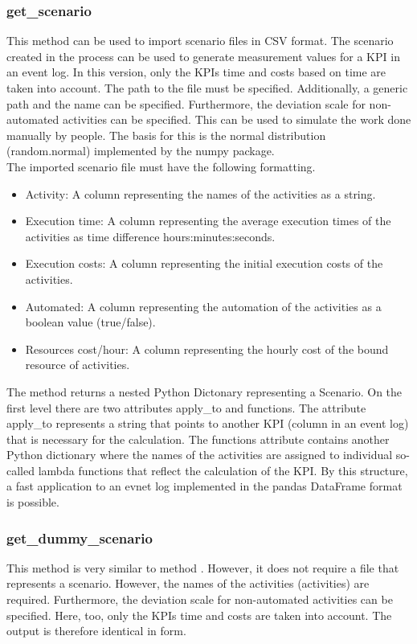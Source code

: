     \subsubsection*{get\_scenario}
    This method can be used to import scenario files in CSV format. The scenario created in the process can be used to generate measurement values for a KPI in an event log. In this version, only the KPIs time and costs based on time are taken into account. The path to the file must be specified. Additionally, a generic path and the name can be specified. Furthermore, the deviation scale for non-automated activities can be specified. This can be used to simulate the work done manually by people. The basis for this is the normal distribution (random.normal) implemented by the numpy package.\\
    The imported scenario file must have the following formatting.
    \begin{itemize}
        \item Activity: A column representing the names of the activities as a string.
        \item Execution time: A column representing the average execution times of the activities as time difference hours:minutes:seconds.
        \item Execution costs: A column representing the initial execution costs of the activities.
        \item Automated: A column representing the automation of the activities as a boolean value (true/false).
        \item Resources cost/hour: A column representing the hourly cost of the bound resource of activities.
    \end{itemize}
    The method returns a nested Python Dictonary representing a Scenario. On the first level there are two attributes apply\_to and functions. The attribute apply\_to represents a string that points to another KPI (column in an event log) that is necessary for the calculation. The functions attribute contains another Python dictionary where the names of the activities are assigned to individual so-called lambda functions that reflect the calculation of the KPI. By this structure, a fast application to an evnet log implemented in the pandas DataFrame format is possible.\label{getscenario}
    \subsubsection*{get\_dummy\_scenario}
    This method is very similar to method . However, it does not require a file that represents a scenario. However, the names of the activities (activities) are required. Furthermore, the deviation scale for non-automated activities can be specified. Here, too, only the KPIs time and costs are taken into account. The output is therefore identical in form.
